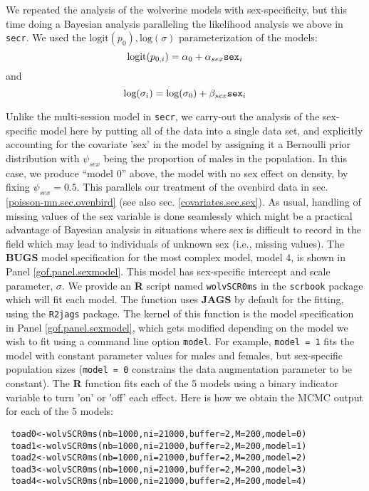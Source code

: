 We repeated the analysis of the wolverine models with sex-specificity,
but this time doing a Bayesian analysis paralleling the likelihood
analysis we above in \mbox{\tt secr}.  
We used the $\mbox{logit}(p_{0}),
\mbox{log}(\sigma)$ parameterization of the models:
\[
 \mbox{logit}(p_{0,i}) = \alpha_{0} + \alpha_{sex} \mbox{\tt sex}_{i}
\]
and
\[
 \mbox{log}(\sigma_{i}) = \log(\sigma_{0}) + \beta_{sex} \mbox{\tt sex}_{i}
\]

Unlike the multi-session model in \mbox{\tt secr}, we carry-out the
analysis of the sex-specific model here by putting all of the data
into a single data set, and explicitly accounting for the covariate
'sex' in the model by assigning it a Bernoulli prior distribution with
$\psi_{sex}$ being the proportion of males in the population. In this
case, we produce ``model 0'' above, the model with no sex effect on
density, by fixing $\psi_{sex} = 0.5$. This parallels our treatment of
the ovenbird data in sec. \ref{poisson-mn.sec.ovenbird} (see also
sec. \ref{covariates.sec.sex}).  As usual, handling of missing values
of the sex variable is done seamlessly which might be a practical
advantage of Bayesian analysis in situations where sex is difficult to
record in the field which may lead to individuals of unknown sex
(i.e., missing values).  The {\bf BUGS} model specification for the
most complex model, model 4, is shown in Panel
\ref{gof.panel.sexmodel}.  This model has sex-specific intercept and
scale parameter, $\sigma$.  We provide an {\bf R} script named
\mbox{\tt wolvSCR0ms} in the \mbox{\tt scrbook} package which will fit
each model.  The function uses {\bf JAGS} by default for the fitting,
using the \mbox{\tt R2jags} package.  The kernel of this function is
the model specification in Panel \ref{gof.panel.sexmodel}, which gets
modified depending on the model we wish to fit using a command line
option \mbox{\tt model}. For example, \mbox{\tt model = 1} fits the
model with constant parameter values for males and females, but
sex-specific population sizes (\mbox{\tt model = 0} constrains the
data augmentation parameter to be constant).  The {\bf R} function
fits each of the 5 models using a binary indicator variable to turn
'on' or 'off' each effect.  Here is how we obtain the MCMC output for
each of the 5 models: {\small
\begin{verbatim}
 toad0<-wolvSCR0ms(nb=1000,ni=21000,buffer=2,M=200,model=0)
 toad1<-wolvSCR0ms(nb=1000,ni=21000,buffer=2,M=200,model=1)
 toad2<-wolvSCR0ms(nb=1000,ni=21000,buffer=2,M=200,model=2)
 toad3<-wolvSCR0ms(nb=1000,ni=21000,buffer=2,M=200,model=3)
 toad4<-wolvSCR0ms(nb=1000,ni=21000,buffer=2,M=200,model=4)
\end{verbatim}
}




